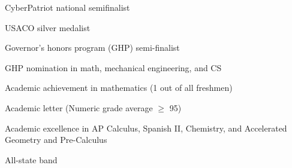 \documentclass[sidebar-width=2.25in, primary=slate]{clean-resume}
\begin{document}
\begin{main}
    
    \begin{lst}
      \item CyberPatriot national semifinalist
      \item USACO silver medalist
      \item Governor's honors program (GHP) semi-finalist
      \item GHP nomination in math, mechanical engineering, and CS
      \item Academic achievement in mathematics (1 out of all freshmen)
      \item Academic letter (Numeric grade average $\ge$ 95)
      \item Academic excellence in AP Calculus, Spanish II, Chemistry, and   Accelerated Geometry and Pre-Calculus
      \item All-state band
    \end{lst}
  \end{main}
\end{document}
